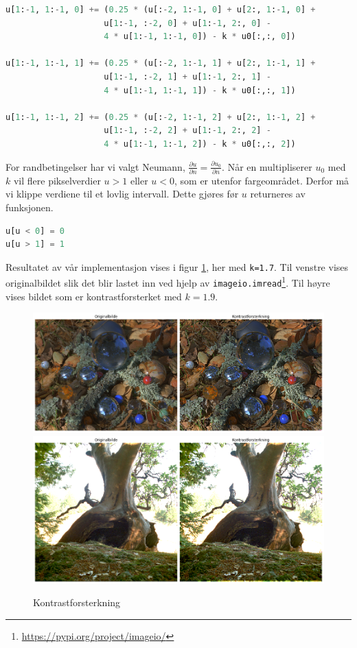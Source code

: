 \begin{lstlisting}[language=Python]
u[1:-1, 1:-1, 0] += (0.25 * (u[:-2, 1:-1, 0] + u[2:, 1:-1, 0] + 
                    u[1:-1, :-2, 0] + u[1:-1, 2:, 0] - 
                    4 * u[1:-1, 1:-1, 0]) - k * u0[:,:, 0])
                    
u[1:-1, 1:-1, 1] += (0.25 * (u[:-2, 1:-1, 1] + u[2:, 1:-1, 1] + 
                    u[1:-1, :-2, 1] + u[1:-1, 2:, 1] - 
                    4 * u[1:-1, 1:-1, 1]) - k * u0[:,:, 1])
                    
u[1:-1, 1:-1, 2] += (0.25 * (u[:-2, 1:-1, 2] + u[2:, 1:-1, 2] + 
                    u[1:-1, :-2, 2] + u[1:-1, 2:, 2] - 
                    4 * u[1:-1, 1:-1, 2]) - k * u0[:,:, 2])
\end{lstlisting}
For randbetingelser har vi valgt Neumann, $\frac{\partial u}{\partial n}=\frac{\partial u_0}{\partial n}$. Når en multipliserer $u_0$ med $k$ vil flere pikselverdier $u > 1$ eller $u < 0$, som er utenfor fargeområdet. Derfor må vi klippe verdiene til et lovlig intervall. Dette gjøres før $u$ returneres av funksjonen.
\begin{lstlisting}[language=Python]
u[u < 0] = 0  
u[u > 1] = 1
\end{lstlisting}
Resultatet av vår implementasjon vises i figur \ref{fig:contrast1}, her med \texttt{k=1.7}. Til venstre vises originalbildet slik det blir lastet inn ved hjelp av \texttt{imageio.imread}\footnote{\url{https://pypi.org/project/imageio/}}. Til høyre vises bildet som er kontrastforsterket med $k = 1.9$.
\begin{figure}[H]
\begin{center}
    \includegraphics[width=0.72\columnwidth]{bilder/kontrast1.png}
     \includegraphics[width=0.72\columnwidth]{bilder/kontrast2.png}
    \caption{Kontrastforsterkning \label{fig:contrast1}}
\end{center}
\end{figure}